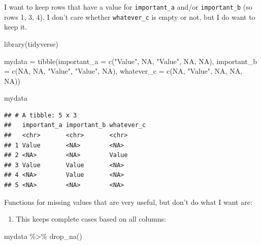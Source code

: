 \documentclass[
]{book}
\newenvironment{Shaded}{\begin{snugshade}}{\end{snugshade}}
\newcommand{\AttributeTok}[1]{\textcolor[rgb]{0.77,0.63,0.00}{#1}}
\newcommand{\ConstantTok}[1]{\textcolor[rgb]{0.00,0.00,0.00}{#1}}
\newcommand{\FunctionTok}[1]{\textcolor[rgb]{0.00,0.00,0.00}{#1}}
\newcommand{\NormalTok}[1]{#1}
\newcommand{\OtherTok}[1]{\textcolor[rgb]{0.56,0.35,0.01}{#1}}
\newcommand{\SpecialCharTok}[1]{\textcolor[rgb]{0.00,0.00,0.00}{#1}}
\newcommand{\StringTok}[1]{\textcolor[rgb]{0.31,0.60,0.02}{#1}}
\providecommand{\tightlist}{%
  \setlength{\itemsep}{0pt}\setlength{\parskip}{0pt}}
\begin{document}
I want to keep rows that have a value for \texttt{important\_a} and/or \texttt{important\_b} (so rows 1, 3, 4).
I don't care whether \texttt{whatever\_c} is empty or not, but I do want to keep it.

\begin{Shaded}
\begin{Highlighting}[]
\FunctionTok{library}\NormalTok{(tidyverse)}

\NormalTok{mydata  }\OtherTok{=} \FunctionTok{tibble}\NormalTok{(}\AttributeTok{important\_a =} \FunctionTok{c}\NormalTok{(}\StringTok{"Value"}\NormalTok{, }\ConstantTok{NA}\NormalTok{, }\StringTok{"Value"}\NormalTok{, }\ConstantTok{NA}\NormalTok{, }\ConstantTok{NA}\NormalTok{),}
                 \AttributeTok{important\_b =} \FunctionTok{c}\NormalTok{(}\ConstantTok{NA}\NormalTok{, }\ConstantTok{NA}\NormalTok{, }\StringTok{"Value"}\NormalTok{, }\StringTok{"Value"}\NormalTok{, }\ConstantTok{NA}\NormalTok{),}
                 \AttributeTok{whatever\_c  =} \FunctionTok{c}\NormalTok{(}\ConstantTok{NA}\NormalTok{, }\StringTok{"Value"}\NormalTok{, }\ConstantTok{NA}\NormalTok{, }\ConstantTok{NA}\NormalTok{, }\ConstantTok{NA}\NormalTok{))}

\NormalTok{mydata}
\end{Highlighting}
\end{Shaded}

\begin{verbatim}
## # A tibble: 5 x 3
##   important_a important_b whatever_c
##   <chr>       <chr>       <chr>     
## 1 Value       <NA>        <NA>      
## 2 <NA>        <NA>        Value     
## 3 Value       Value       <NA>      
## 4 <NA>        Value       <NA>      
## 5 <NA>        <NA>        <NA>
\end{verbatim}

Functions for missing values that are very useful, but don't do what I want are:

\begin{enumerate}
\def\labelenumi{(\arabic{enumi})}
\tightlist
\item
  This keeps complete cases based on all columns:
\end{enumerate}

\begin{Shaded}
\begin{Highlighting}[]
\NormalTok{mydata }\SpecialCharTok{\%\textgreater{}\%} 
  \FunctionTok{drop\_na}\NormalTok{()}
\end{Highlighting}
\end{Shaded}
\end{document}
